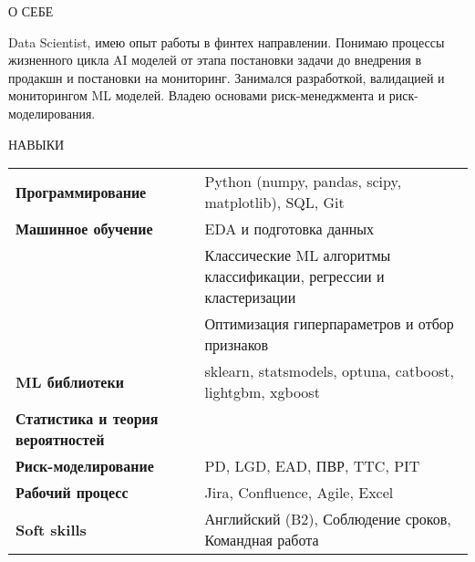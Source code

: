 \documentclass{resume} %
\begin{document}
\large
\begin{rSection}{О СЕБЕ}

{Data Scientist, имею опыт работы в финтех направлении. Понимаю процессы жизненного цикла AI моделей от этапа постановки задачи до внедрения в продакшн и постановки на мониторинг. Занимался разработкой, валидацией и мониторингом ML моделей. Владею основами риск-менеджмента и риск-моделирования.}


\end{rSection}

\begin{rSection}{НАВЫКИ}


\begin{tabular}{ @{} >{\bfseries}l @{\hspace{6ex}} l }

Программирование & Python (numpy, pandas, scipy, matplotlib), SQL, Git
\\
Машинное обучение &  EDA и подготовка данных
\\
& Классические ML алгоритмы классификации, регрессии и кластеризации
\\
& Оптимизация гиперпараметров и отбор признаков
\\
ML библиотеки & sklearn, statsmodels, optuna, catboost, lightgbm, xgboost
\\
Статистика и теория вероятностей & 
\\
Риск-моделирование & PD, LGD, EAD, ПВР, TTC, PIT
\\
Рабочий процесс & Jira, Confluence, Agile, Excel
\\
Soft skills & Английский (B2), Соблюдение сроков, Командная работа
\\

\end{tabular}\\

\end{rSection}
\end{document}
